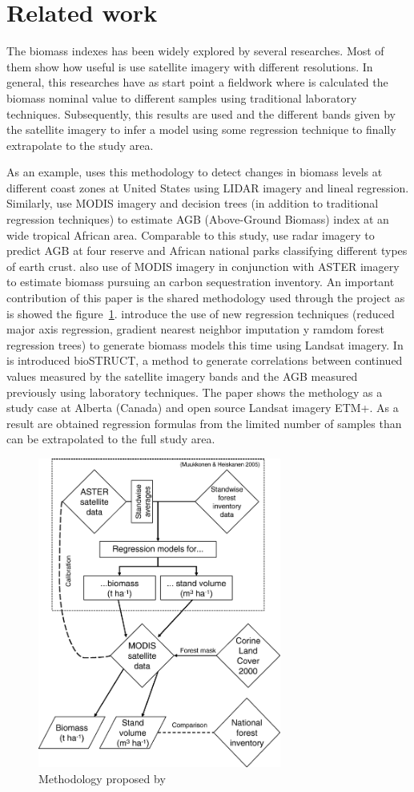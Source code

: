 \section{Related work}

The biomass indexes has been widely explored by several researches. Most of them show how useful is use satellite imagery with different resolutions. In general, this researches have as start point a fieldwork where is calculated the biomass nominal value to different samples using traditional laboratory techniques. Subsequently, this results are used and the different bands given by the satellite imagery to infer a model using some regression technique to finally extrapolate to the study area.

As an example, \cite{klemas2013remotesensing} uses this methodology to detect changes in biomass levels at different coast zones at United States using LIDAR imagery and lineal regression. Similarly, \cite{baccini2008afirst} use MODIS imagery and decision trees (in addition to traditional regression techniques) to estimate AGB (Above-Ground Biomass) index at an wide tropical African area. Comparable to this study, \cite{mitchard2009usingsatellite} use radar imagery to predict AGB at four reserve and African national parks classifying different types of earth crust. \cite{muukkonen2007biomass} also use of MODIS imagery in conjunction with ASTER imagery to estimate biomass pursuing an carbon sequestration inventory. An important contribution of this paper is the shared methodology used through the project as is showed the figure~\ref{fig:Mukkonnen01}. \cite{powell2010quantification} introduce the use of new regression techniques (reduced major axis regression, gradient nearest neighbor imputation y ramdom forest regression trees) to generate biomass models this time using Landsat imagery. In \cite{hall2006modeling} is introduced bioSTRUCT, a method to generate correlations between continued values measured by the satellite imagery bands and the AGB measured previously using laboratory techniques. The paper shows the methology as a study case at Alberta (Canada) and open source Landsat imagery ETM+. As a result are obtained regression formulas from the limited number of samples than can be extrapolated to the full study area.

\begin{figure}
  \centering
  \includegraphics[width = 8cm]{Mukkonnen01.png}
  \caption{Methodology proposed by \cite{muukkonen2007biomass}}
  \label{fig:Mukkonnen01}
\end{figure}